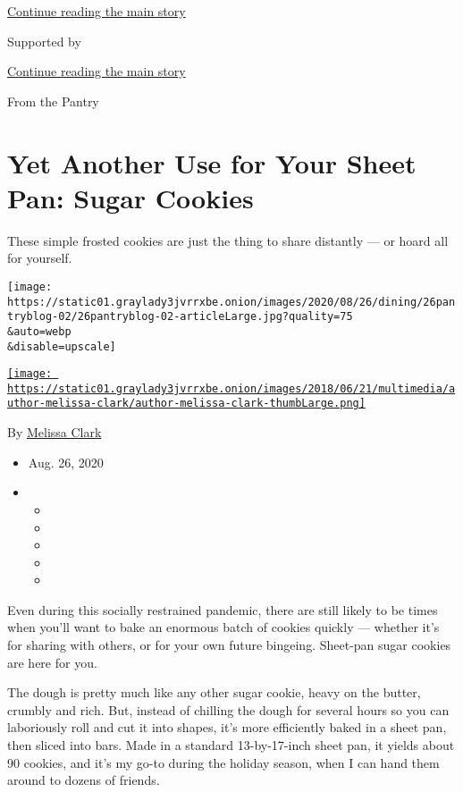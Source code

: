 \protect\hyperlink{after-top}{Continue reading the main story}

Supported by

\protect\hyperlink{after-sponsor}{Continue reading the main story}

From the Pantry

\hypertarget{yet-another-use-for-your-sheet-pan-sugar-cookies}{%
\section{Yet Another Use for Your Sheet Pan: Sugar
Cookies}\label{yet-another-use-for-your-sheet-pan-sugar-cookies}}

These simple frosted cookies are just the thing to share distantly ---
or hoard all for yourself.

\texttt{[image: https://static01.graylady3jvrrxbe.onion/images/2020/08/26/dining/26pantryblog-02/26pantryblog-02-articleLarge.jpg?quality=75\\\&auto=webp\\\&disable=upscale]}

\href{https://www.nytimes3xbfgragh.onion/by/melissa-clark}{\texttt{[image: https://static01.graylady3jvrrxbe.onion/images/2018/06/21/multimedia/author-melissa-clark/author-melissa-clark-thumbLarge.png]}}

By \href{https://www.nytimes3xbfgragh.onion/by/melissa-clark}{Melissa
Clark}

\begin{itemize}
\item
  Aug. 26, 2020
\item
  \begin{itemize}
  \item
  \item
  \item
  \item
  \item
  \end{itemize}
\end{itemize}

Even during this socially restrained pandemic, there are still likely to
be times when you'll want to bake an enormous batch of cookies quickly
--- whether it's for sharing with others, or for your own future
bingeing. Sheet-pan sugar cookies are here for you.

The dough is pretty much like any other sugar cookie, heavy on the
butter, crumbly and rich. But, instead of chilling the dough for several
hours so you can laboriously roll and cut it into shapes, it's more
efficiently baked in a sheet pan, then sliced into bars. Made in a
standard 13-by-17-inch sheet pan, it yields about 90 cookies, and it's
my go-to during the holiday season, when I can hand them around to
dozens of friends.

